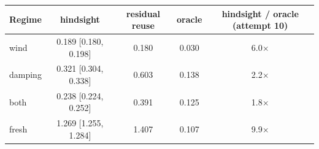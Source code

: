 \begin{tabular}{lcccc}
\toprule
Regime & hindsight & residual reuse & oracle & hindsight / oracle (attempt 10) \\
\midrule
wind & 0.189 [0.180, 0.198] & 0.180 & 0.030 & 6.0$\times$ \\
damping & 0.321 [0.304, 0.338] & 0.603 & 0.138 & 2.2$\times$ \\
both & 0.238 [0.224, 0.252] & 0.391 & 0.125 & 1.8$\times$ \\
fresh & 1.269 [1.255, 1.284] & 1.407 & 0.107 & 9.9$\times$ \\
\bottomrule
\end{tabular}
